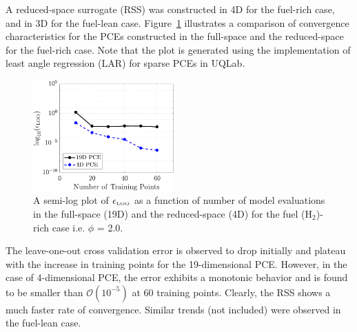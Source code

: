 A reduced-space surrogate (RSS) was constructed in 4D for the fuel-rich case,
and in 3D for
the fuel-lean case. Figure~\ref{fig:err_samples_kinetics} illustrates a
comparison of convergence characteristics for the PCEs constructed in the
full-space and the reduced-space for the fuel-rich case. Note that the
plot is generated using the implementation of least angle regression (LAR)
for sparse PCEs in UQLab.  
%
\begin{figure}[htbp]
 \begin{center}
  \includegraphics[width=0.48\textwidth]{./Figures/err_samples_kinetics}
\caption{A semi-log plot of $\epsilon_\text{\tiny LOO}$ as a function of
number of model evaluations in the full-space (19D) and the reduced-space (4D)
for the fuel (H$_2$)-rich case i.e. $\phi$ = 2.0.}
\label{fig:err_samples_kinetics}
\end{center}
\end{figure}
%
The leave-one-out cross validation error is observed to drop initially
and plateau with the increase in training points for the 19-dimensional
PCE. However, in the case of 4-dimensional PCE, the error exhibits a
monotonic behavior and is found to be smaller than $\mathcal{O}(10^{-5})$
at 60 training points. Clearly, the RSS shows a much faster rate of convergence.
Similar trends (not included) were observed in the fuel-lean case. 

